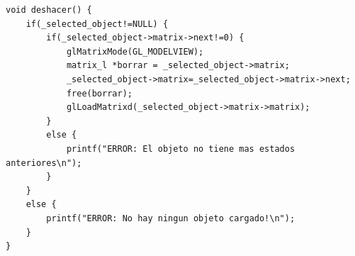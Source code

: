\documentclass[12pt,a4paper]{article}
\begin{document}
\begin{enumerate}
\begin{lstlisting}
void deshacer() {
    if(_selected_object!=NULL) {
		if(_selected_object->matrix->next!=0) {
			glMatrixMode(GL_MODELVIEW);
			matrix_l *borrar = _selected_object->matrix;
			_selected_object->matrix=_selected_object->matrix->next;
			free(borrar);
			glLoadMatrixd(_selected_object->matrix->matrix);
		}
		else {
			printf("ERROR: El objeto no tiene mas estados anteriores\n");
		}
	}
    else {
        printf("ERROR: No hay ningun objeto cargado!\n");
    }
}
\end{lstlisting}
\end{enumerate}
\end{document}
